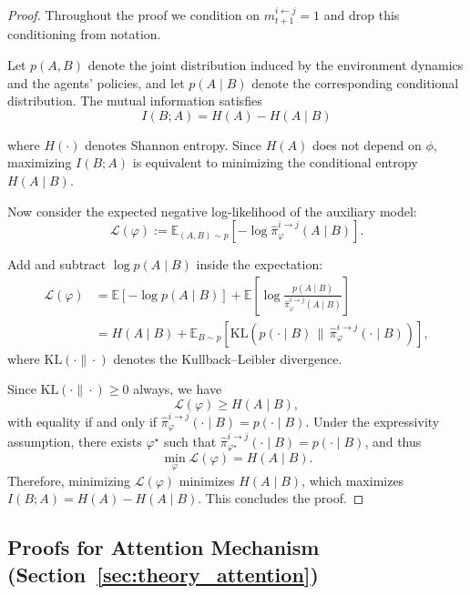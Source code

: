 \documentclass{article}
\theoremstyle{plain}
\theoremstyle{definition}
\theoremstyle{remark}
\begin{document}
\begin{proof}
Throughout the proof we condition on $m_{t+1}^{i \leftarrow j} = 1$ and drop this conditioning from notation.

Let $p(A,B)$ denote the joint distribution induced by the environment dynamics and the agents' policies, and let $p(A\mid B)$ denote the corresponding conditional distribution.
The mutual information satisfies
\begin{equation}
    I(B;A) = H(A) - H(A \mid B)
\end{equation}


where $H(\cdot)$ denotes Shannon entropy.
Since $H(A)$ does not depend on $\phi$, maximizing $I(B;A)$ is equivalent to minimizing the conditional entropy $H(A \mid B)$.

Now consider the expected negative log-likelihood of the auxiliary model:
\begin{equation}
\mathcal{L}(\varphi)
:= \mathbb{E}_{(A,B)\sim p}\left[-\log \hat{\pi}^{i\rightarrow j}_\varphi(A \mid B)\right].
\end{equation}

Add and subtract $\log p(A\mid B)$ inside the expectation:
\begin{align*}
\mathcal{L}(\varphi)
&= \mathbb{E}\left[-\log p(A\mid B)\right]
  + \mathbb{E}\left[\log \frac{p(A\mid B)}{\hat{\pi}^{i\rightarrow j}_\varphi(A\mid B)}\right] \\
&= H(A\mid B) + \mathbb{E}_{B\sim p}\left[ \mathrm{KL}\!\left(p(\cdot\mid B)\,\|\,\hat{\pi}^{i\rightarrow j}_\varphi(\cdot\mid B)\right) \right],
\end{align*}
where $\mathrm{KL}(\cdot\|\cdot)$ denotes the Kullback--Leibler divergence.

Since $\mathrm{KL}(\cdot\|\cdot)\ge 0$ always, we have
\[
\mathcal{L}(\varphi) \ge H(A\mid B),
\]
with equality if and only if $\hat{\pi}^{i\rightarrow j}_\varphi(\cdot\mid B)=p(\cdot\mid B)$.
Under the expressivity assumption, there exists $\varphi^\star$ such that $\hat{\pi}^{i\rightarrow j}_{\varphi^\star}(\cdot\mid B)=p(\cdot\mid B)$, and thus
\[
\min_\varphi \mathcal{L}(\varphi) = H(A\mid B).
\]
Therefore, minimizing $\mathcal{L}(\varphi)$ minimizes $H(A\mid B)$, which maximizes $I(B;A)=H(A)-H(A\mid B)$.
This concludes the proof.
\end{proof}

\subsection{Proofs for Attention Mechanism (Section~\ref{sec:theory_attention})}
\label{app:proofs}
\end{document}
